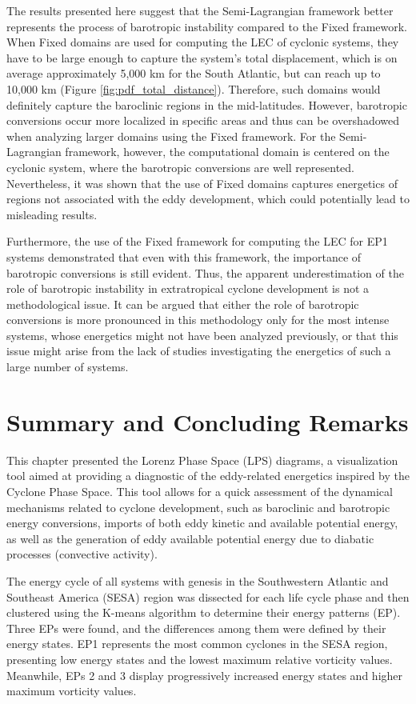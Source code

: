 The results presented here suggest that the Semi-Lagrangian framework better represents the process of barotropic instability compared to the Fixed framework. When Fixed domains are used for computing the LEC of cyclonic systems, they have to be large enough to capture the system's total displacement, which is on average approximately 5,000 km for the South Atlantic, but can reach up to 10,000 km (Figure \ref{fig:pdf_total_distance}). Therefore, such domains would definitely capture the baroclinic regions in the mid-latitudes. However, barotropic conversions occur more localized in specific areas and thus can be overshadowed when analyzing larger domains using the Fixed framework. For the Semi-Lagrangian framework, however, the computational domain is centered on the cyclonic system, where the barotropic conversions are well represented. Nevertheless, it was shown that the use of Fixed domains captures energetics of regions not associated with the eddy development, which could potentially lead to misleading results.

Furthermore, the use of the Fixed framework for computing the LEC for EP1 systems demonstrated that even with this framework, the importance of barotropic conversions is still evident. Thus, the apparent underestimation of the role of barotropic instability in extratropical cyclone development is not a methodological issue. It can be argued that either the role of barotropic conversions is more pronounced in this methodology only for the most intense systems, whose energetics might not have been analyzed previously, or that this issue might arise from the lack of studies investigating the energetics of such a large number of systems.

\section{Summary and Concluding Remarks}

This chapter presented the Lorenz Phase Space (LPS) diagrams, a visualization tool aimed at providing a diagnostic of the eddy-related energetics inspired by the \citet{hart2003cyclone} Cyclone Phase Space. This tool allows for a quick assessment of the dynamical mechanisms related to cyclone development, such as baroclinic and barotropic energy conversions, imports of both eddy kinetic and available potential energy, as well as the generation of eddy available potential energy due to diabatic processes (convective activity).

The energy cycle of all systems with genesis in the Southwestern Atlantic and Southeast America (SESA) region was dissected for each life cycle phase and then clustered using the K-means algorithm to determine their energy patterns (EP). Three EPs were found, and the differences among them were defined by their energy states. EP1 represents the most common cyclones in the SESA region, presenting low energy states and the lowest maximum relative vorticity values. Meanwhile, EPs 2 and 3 display progressively increased energy states and higher maximum vorticity values.

